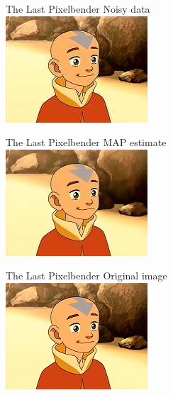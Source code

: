 \documentclass[10pt]{beamer}
\begin{document}
\begin{frame}{The Last Pixelbender}
\centering
Noisy data
\\
\includegraphics[height=40ex]{results/aang2-tmp} 
\end{frame}
\begin{frame}{The Last Pixelbender}
\centering
MAP estimate\vphantom{y}
\\
\includegraphics[height=40ex]{results/aang2-fixed}
\end{frame}
\begin{frame}{The Last Pixelbender}
\centering
Original image
\\
\includegraphics[height=40ex]{results/aang2} 
\end{frame}
\end{document}
